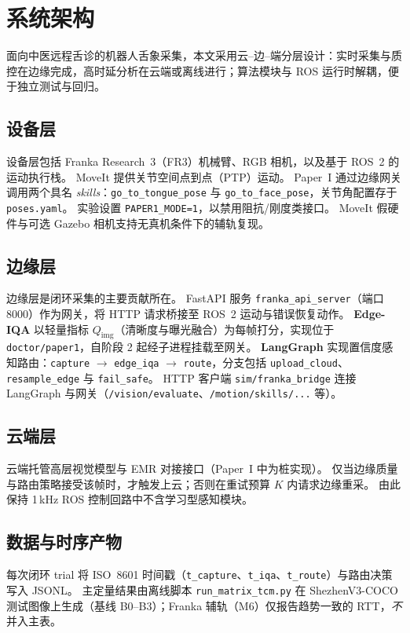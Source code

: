 \section{系统架构}
\label{sec:system-zh}

面向中医远程舌诊的机器人舌象采集，本文采用云--边--端分层设计：实时采集与质控在边缘完成，高时延分析在云端或离线进行；算法模块与 ROS 运行时解耦，便于独立测试与回归。

\subsection{设备层}
设备层包括 Franka Research~3（FR3）机械臂、RGB 相机，以及基于 ROS~2 的运动执行栈。
MoveIt 提供关节空间点到点（PTP）运动。
Paper~I 通过边缘网关调用两个具名 \emph{skills}：\texttt{go\_to\_tongue\_pose} 与 \texttt{go\_to\_face\_pose}，关节角配置存于 \texttt{poses.yaml}。
实验设置 \texttt{PAPER1\_MODE=1}，以禁用阻抗/刚度类接口。
MoveIt 假硬件与可选 Gazebo 相机支持无真机条件下的辅轨复现。

\subsection{边缘层}
边缘层是闭环采集的主要贡献所在。
FastAPI 服务 \texttt{franka\_api\_server}（端口 8000）作为网关，将 HTTP 请求桥接至 ROS~2 运动与错误恢复动作。
\textbf{Edge-IQA} 以轻量指标 $Q_{\mathrm{img}}$（清晰度与曝光融合）为每帧打分，实现位于 \texttt{doctor/paper1}，自阶段 2 起经子进程挂载至网关。
\textbf{LangGraph} 实现置信度感知路由：\texttt{capture} $\rightarrow$ \texttt{edge\_iqa} $\rightarrow$ \texttt{route}，分支包括 \texttt{upload\_cloud}、\texttt{resample\_edge} 与 \texttt{fail\_safe}。
HTTP 客户端 \texttt{sim/franka\_bridge} 连接 LangGraph 与网关（\texttt{/vision/evaluate}、\texttt{/motion/skills/...} 等）。

\subsection{云端层}
云端托管高层视觉模型与 EMR 对接接口（Paper~I 中为桩实现）。
仅当边缘质量与路由策略接受该帧时，才触发上云；否则在重试预算 $K$ 内请求边缘重采。
由此保持 1\,kHz ROS 控制回路中不含学习型感知模块。

\subsection{数据与时序产物}
每次闭环 trial 将 ISO~8601 时间戳（\texttt{t\_capture}、\texttt{t\_iqa}、\texttt{t\_route}）与路由决策写入 JSONL。
主定量结果由离线脚本 \texttt{run\_matrix\_tcm.py} 在 ShezhenV3-COCO 测试图像上生成（基线 B0--B3）；Franka 辅轨（M6）仅报告趋势一致的 RTT，\emph{不}并入主表。

